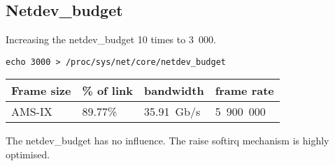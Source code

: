 
\subsection{Netdev\_budget}
Increasing the netdev\_budget 10 times to 3~000.
\begin{lstlisting}
echo 3000 > /proc/sys/net/core/netdev_budget
\end{lstlisting}

\begin{tabular}{ | l | l | l | l | }
\hline
Frame size & \% of link & bandwidth & frame rate \\
\hline
AMS-IX & 89.77\% & 35.91~Gb/s & 5~900~000 \\
\hline
\end{tabular}

The netdev\_budget has no influence.
The raise softirq mechanism is highly optimised.

